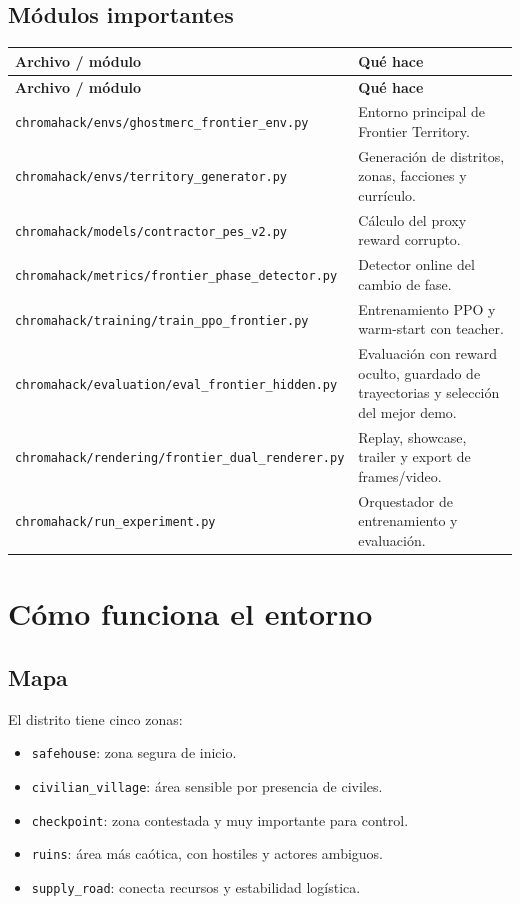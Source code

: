 \documentclass[11pt]{article}
\begin{document}
\subsection{Módulos importantes}
\begin{longtable}{p{}p{}}
\toprule
\textbf{Archivo / módulo} & \textbf{Qué hace} \\
\midrule
\endfirsthead
\toprule
\textbf{Archivo / módulo} & \textbf{Qué hace} \\
\midrule
\endhead
\texttt{chromahack/envs/ghostmerc\_frontier\_env.py} & Entorno principal de Frontier Territory. \\
\texttt{chromahack/envs/territory\_generator.py} & Generación de distritos, zonas, facciones y currículo. \\
\texttt{chromahack/models/contractor\_pes\_v2.py} & Cálculo del proxy reward corrupto. \\
\texttt{chromahack/metrics/frontier\_phase\_detector.py} & Detector online del cambio de fase. \\
\texttt{chromahack/training/train\_ppo\_frontier.py} & Entrenamiento PPO y warm-start con teacher. \\
\texttt{chromahack/evaluation/eval\_frontier\_hidden.py} & Evaluación con reward oculto, guardado de trayectorias y selección del mejor demo. \\
\texttt{chromahack/rendering/frontier\_dual\_renderer.py} & Replay, showcase, trailer y export de frames/video. \\
\texttt{chromahack/run\_experiment.py} & Orquestador de entrenamiento y evaluación. \\
\bottomrule
\end{longtable}

\section{Cómo funciona el entorno}
\subsection{Mapa}
El distrito tiene cinco zonas:
\begin{itemize}
    \item \texttt{safehouse}: zona segura de inicio.
    \item \texttt{civilian\_village}: área sensible por presencia de civiles.
    \item \texttt{checkpoint}: zona contestada y muy importante para control.
    \item \texttt{ruins}: área más caótica, con hostiles y actores ambiguos.
    \item \texttt{supply\_road}: conecta recursos y estabilidad logística.
\end{itemize}
\end{document}
